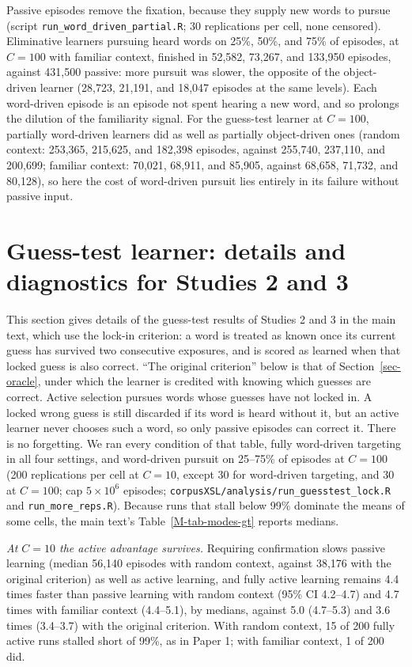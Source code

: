 \documentclass[11pt]{article}
\begin{document}
Passive episodes remove the fixation, because they supply new words to pursue (script \texttt{run\_word\_driven\_partial.R}; 30 replications per cell, none censored). Eliminative learners pursuing heard words on 25\%, 50\%, and 75\% of episodes, at $C=100$ with familiar context, finished in 52,582, 73,267, and 133,950 episodes, against 431,500 passive: more pursuit was slower, the opposite of the object-driven learner (28,723, 21,191, and 18,047 episodes at the same levels). Each word-driven episode is an episode not spent hearing a new word, and so prolongs the dilution of the familiarity signal. For the guess-test learner at $C=100$, partially word-driven learners did as well as partially object-driven ones (random context: 253,365, 215,625, and 182,398 episodes, against 255,740, 237,110, and 200,699; familiar context: 70,021, 68,911, and 85,905, against 68,658, 71,732, and 80,128), so here the cost of word-driven pursuit lies entirely in its failure without passive input.

\section{Guess-test learner: details and diagnostics for Studies 2 and 3}
\label{sec-lock}
This section gives details of the guess-test results of Studies 2 and 3 in the main text, which use the lock-in criterion: a word is treated as known once its current guess has survived two consecutive exposures, and is scored as learned when that locked guess is also correct. ``The original criterion'' below is that of Section~\ref{sec-oracle}, under which the learner is credited with knowing which guesses are correct. Active selection pursues words whose guesses have not locked in. A locked wrong guess is still discarded if its word is heard without it, but an active learner never chooses such a word, so only passive episodes can correct it. There is no forgetting. We ran every condition of that table, fully word-driven targeting in all four settings, and word-driven pursuit on 25--75\% of episodes at $C=100$ (200 replications per cell at $C=10$, except 30 for word-driven targeting, and 30 at $C=100$; cap $5 \times 10^6$ episodes; \texttt{corpusXSL/analysis/run\_guesstest\_lock.R} and \texttt{run\_more\_reps.R}). Because runs that stall below 99\% dominate the means of some cells, the main text's Table~\ref{M-tab-modes-gt} reports medians.

\textit{At $C=10$ the active advantage survives.} Requiring confirmation slows passive learning (median 56,140 episodes with random context, against 38,176 with the original criterion) as well as active learning, and fully active learning remains 4.4 times faster than passive learning with random context (95\% CI 4.2--4.7) and 4.7 times with familiar context (4.4--5.1), by medians, against 5.0 (4.7--5.3) and 3.6 times (3.4--3.7) with the original criterion. With random context, 15 of 200 fully active runs stalled short of 99\%, as in Paper 1; with familiar context, 1 of 200 did.
\end{document}
